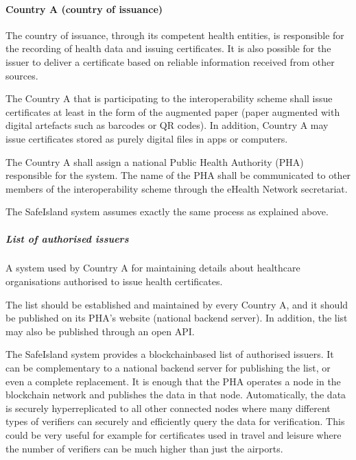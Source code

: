 \documentclass[a4paper,12pt,english]{sphinxhowto}
\begin{document}
\paragraph{Country A (country of issuance)}
\label{\detokenize{ssi/annotehealth:country-a-country-of-issuance}}
\sphinxAtStartPar
The country of issuance, through its competent health entities, is responsible for the recording of health data and issuing certificates. It is also possible for the issuer to deliver a certificate based on reliable information received from other sources.

\sphinxAtStartPar
The Country A that is participating to the interoperability scheme shall issue certificates at least in the form of the augmented paper (paper augmented with digital artefacts such as barcodes or QR codes). In addition, Country A may issue certificates stored as purely digital files in apps or computers.

\sphinxAtStartPar
The Country A shall assign a national Public Health Authority (PHA) responsible for the system. The name of the PHA shall be communicated to other members of the interoperability scheme through the eHealth Network secretariat.

\begin{sphinxShadowBox}

\sphinxAtStartPar
The SafeIsland system assumes exactly the same process as explained above.
\end{sphinxShadowBox}


\subparagraph{List of authorised issuers}
\label{\detokenize{ssi/annotehealth:list-of-authorised-issuers}}
\sphinxAtStartPar
A system used by Country A for maintaining details about healthcare organisations authorised to issue health certificates.

\sphinxAtStartPar
The list should be established and maintained by every Country A, and it should be published on its PHA’s website (national backend server). In addition, the list may also be published through an open API.

\begin{sphinxShadowBox}

\sphinxAtStartPar
The SafeIsland system provides a blockchain\sphinxhyphen{}based list of authorised issuers. It can be complementary to a national backend server for publishing the list, or even a complete replacement. It is enough that the PHA operates a node in the blockchain network and publishes the data in that node. Automatically, the data is securely hyper\sphinxhyphen{}replicated to all other connected nodes where many different types of verifiers can securely and efficiently query the data for verification. This could be very useful for example for certificates used in travel and leisure where the number of verifiers can be much higher than just the airports.
\end{sphinxShadowBox}
\end{document}
